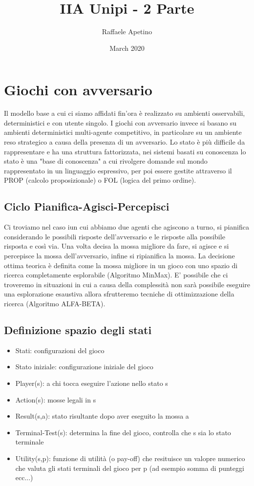 \documentclass{article}
\title{IIA Unipi - 2 Parte}
\author{Raffaele Apetino}
\date{March 2020}
\begin{document}
\maketitle

\tableofcontents{}
\clearpage

\section{Giochi con avversario}
Il modello base a cui ci siamo affidati fin'ora è realizzato su ambienti osservabili, deterministici e con utente singolo.
I giochi con avversario invece si basano su ambienti deterministici multi-agente competitivo, in particolare su un ambiente reso strategico a causa della presenza di un avversario. Lo stato è più difficile da rappresentare e ha una struttura fattorizzata, nei sistemi basati su conoscenza lo stato è una "base di conoscenza" a cui rivolgere domande sul mondo rappresentato in un linguaggio espressivo, per poi essere gestite attraverso il PROP (calcolo proposizionale) o FOL (logica del primo ordine). 

\subsection{Ciclo Pianifica-Agisci-Percepisci}
Ci troviamo nel caso iun cui abbiamo due agenti che agiscono a turno, si pianifica considerando le possibili risposte dell'avversario e le risposte alla possibile risposta e così via. Una volta decisa la mossa migliore da fare, si agisce e si percepisce la mossa dell'avversario, infine si ripianifica la mossa. La decisione ottima teorica è definita come la mossa migliore in un gioco con uno spazio di ricerca completamente esplorabile (Algoritmo MinMax). E' possibile che ci troveremo in situazioni in cui a causa della complessità non sarà possibile eseguire una esplorazione esaustiva allora sfrutteremo tecniche di ottimizzazione della ricerca (Algoritmo ALFA-BETA).

\subsection{Definizione spazio degli stati}

\begin{itemize}
    \item Stati: configurazioni del gioco
    \item Stato iniziale: configurazione iniziale del gioco
    \item Player(s): a chi tocca eseguire l'azione nello stato s
    \item Action(s): mosse legali in s
    \item Result(s,a): stato risultante dopo aver eseguito la mossa a
    \item Terminal-Test(s): determina la fine del gioco, controlla che s sia lo stato terminale
    \item Utility(s,p): funzione di utilità (o pay-off) che resituisce un valopre numerico che valuta gli stati terminali del gioco per p (ad esempio somma di punteggi ecc...)
\end{itemize}
\newpage
\end{document}
